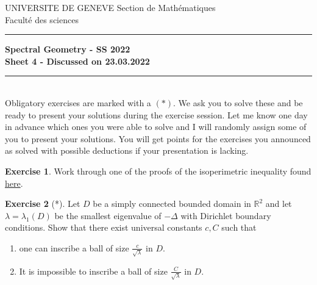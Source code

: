 \documentclass[a4paper,11pt]{article}
\theoremstyle{definition}
\newtheorem{exercise}{Exercise}
\begin{document}
\pagestyle{headings}
\noindent UNIVERSITE DE GENEVE \hfill Section de Mathématiques\\
\noindent Facult\'e des sciences \hfill \\[-3mm]
\hrule

\large

\begin{center}
\textbf{Spectral Geometry - SS 2022 \\ Sheet 4 - Discussed on 23.03.2022}
\end{center}
\hrule
\text{}\\[1cm]

Obligatory exercises are marked with a $(*)$. We ask you to solve these and be ready to present your solutions during the exercise session. Let me know one day in advance which ones you were able to solve and I will randomly assign some of you to present your solutions. You will get points for the exercises you announced as solved with possible deductions if your presentation is lacking.

\begin{exercise}
	Work through one of the proofs of the isoperimetric inequality found \href{https://math.jhu.edu/~amramor1/439_F19_supp1.pdf}{here}.
\end{exercise}

\begin{exercise}[*]
	Let $D$ be a simply connected bounded domain in $\mathbb{R}^2$ and let $\lambda = \lambda_1(D)$ be the smallest eigenvalue of $-\Delta$ with Dirichlet boundary conditions. Show that there exist universal constants $c, C$ such that
	\begin{enumerate}
			\item one can inscribe a ball of size $\frac{c}{\sqrt{\lambda}}$ in $D$.
			\item It is impossible to inscribe a ball of size $\frac{C}{\sqrt{\lambda}}$ in $D$.
		\end{enumerate}	
\end{exercise}
\end{document}
